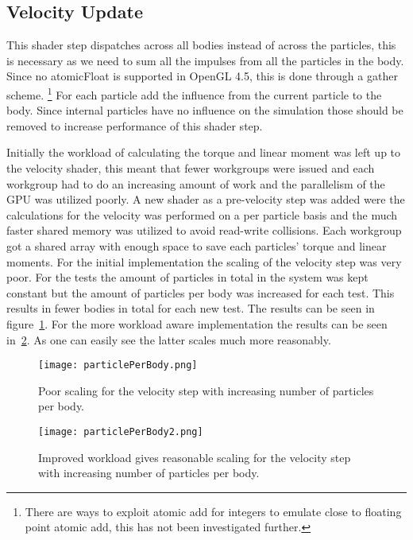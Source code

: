 \subsection{Velocity Update}
This shader step dispatches across all bodies instead of across the particles, this
is necessary as we need to sum all the impulses from all the particles in the body.
Since no atomicFloat is supported in OpenGL 4.5, this is done through a gather scheme.
\footnote{There are ways to exploit atomic add for integers to emulate close to floating point atomic add, this has not been investigated further.}
For each particle add the influence from the current particle to the body.
Since internal particles have no influence on the simulation
those should be removed to increase performance of this shader step.

Initially the workload of calculating the torque and linear moment was left up to the velocity shader,
this meant that fewer workgroups were issued and each workgroup had to do an increasing
amount of work and the parallelism of the GPU was utilized poorly. A new shader as
a pre-velocity step was added were the calculations for the velocity was performed
on a per particle basis and the much faster shared memory was utilized to avoid
read-write collisions. Each workgroup got a shared array with enough space to save
each particles' torque and linear moments. For the initial implementation the scaling of
the velocity step was very poor. For the tests the amount of particles in total in the
system was kept constant but the amount of particles per body was increased for each test.
This results in fewer bodies in total for each new test. The results can be seen in figure~\ref{fig:velScale1}.
For the more workload aware implementation the results can be seen in~\ref{fig:velScale2}.
As one can easily see the latter scales much more reasonably.

\begin{figure}[H]
  \centering
  \texttt{[image: particlePerBody.png]}
  \caption{Poor scaling for the velocity step with increasing number of particles per body.}
  \label{fig:velScale1}
\end{figure}

\begin{figure}[H]
  \centering
  \texttt{[image: particlePerBody2.png]}
  \caption{Improved workload gives reasonable scaling for the velocity step with increasing number of particles per body.}
  \label{fig:velScale2}
\end{figure}

